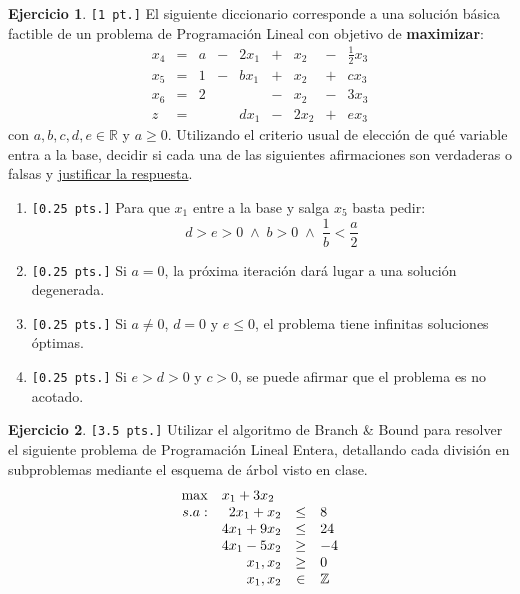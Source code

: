 \documentclass[a4paper,oneside,12pt]{amsart}
\theoremstyle{definition}
\newtheorem{quest}{Ejercicio}
\begin{document}
\begin{quest}
    \verb|[1 pt.]| El siguiente diccionario corresponde a una solución básica factible de un problema de
    Programación Lineal con objetivo de \textbf{maximizar}:
    \[
    \begin{array}{rrrrrrrrr}
        x_4&=&a&-&2x_1&+&x_2&-&\frac{1}{2}x_3\\
        x_5&=&1&-&bx_1&+&x_2&+&cx_3\\
        x_6&=&2&&&-&x_2&-&3x_3\\ \hline
        z&=&&&dx_1&-&2x_2 &+&ex_3
    \end{array}
    \]
    con $a,b,c,d,e\in \mathbb{R}$ y $a\geq 0$. Utilizando el criterio usual de elección de qué variable entra a la
    base, decidir si cada una de las siguientes afirmaciones son verdaderas o falsas y
    \underline{justificar la respuesta}.
    \begin{enumerate}[label=\alph*)]
        \item \verb|[0.25 pts.]| Para que $x_1$ entre a la base y salga $x_5$ basta pedir:
        \[d>e>0 \;\wedge\; b>0 \;\wedge\; \frac{1}{b} < \frac{a}{2} \]
        \item \verb|[0.25 pts.]| Si $a=0$, la próxima iteración dará lugar a una solución degenerada.
        \item \verb|[0.25 pts.]| Si $a\neq 0$, $d=0$ y $e\leq0$, el problema tiene infinitas soluciones óptimas.
        \item \verb|[0.25 pts.]| Si $e>d>0$ y $c > 0$, se puede afirmar que el problema es no acotado.
    \end{enumerate}

\end{quest}


\begin{quest} 
\verb|[3.5 pts.]| Utilizar el algoritmo de Branch \& Bound para resolver el siguiente problema de Programación Lineal
Entera, detallando cada división en subproblemas mediante el esquema de árbol visto en clase.
\[
\begin{array}{rrcl}
\max & \multicolumn{3}{l}{x_1+3x_2} \\
s.a: & 2x_1+x_2 & \leq & 8 \\
 & 4x_1+9x_2 & \leq & 24 \\
 & 4x_1-5x_2 & \geq & -4 \\
 & x_1, x_2 & \geq & 0 \\
 & x_1, x_2 & \in & \mathbb{Z}
\end{array}
\]
\end{quest}
\end{document}
